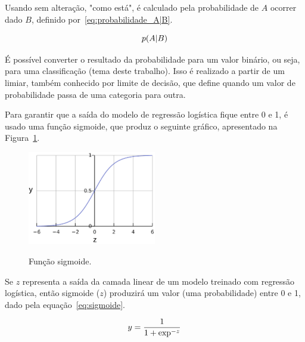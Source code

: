             Usando sem alteração, "como está", é calculado pela probabilidade de $A$ ocorrer dado $B$, definido por~\ref{eq:probabilidade_A|B}.
            
            \begin{equation}
                \centering
                p(A|B)
                \label{eq:probabilidade_A|B} 
            \end{equation}
            
            É possível converter o resultado da probabilidade para um valor binário, ou seja, para uma classificação (tema deste trabalho). Isso é realizado a partir de um limiar, também conhecido por limite de decisão, que define quando um valor de probabilidade passa de uma categoria para outra.
            
            Para garantir que a saída do modelo de regressão logística fique entre 0 e 1, é usado uma função sigmoide, que produz o seguinte gráfico, apresentado na Figura~\ref{fig:sigmoide}. 
        
            \begin{figure}[H]
                \centering
                \caption{Função sigmoide.}
                \includegraphics[width=0.5\textwidth]{fig/2-fundamentacao/aprendizado/sigmoide.png}
                \label{fig:sigmoide}
            \end{figure}
            
            Se $z$ representa a saída da camada linear de um modelo treinado com regressão logística, então sigmoide ($z$) produzirá um valor (uma probabilidade) entre 0 e 1, dado pela equação~\ref{eq:sigmoide}. 
            
            \begin{equation}
                \label{eq:sigmoide}
                \centering
                y = \frac{1}{1 + \exp^{-z}}
            \end{equation}
            

